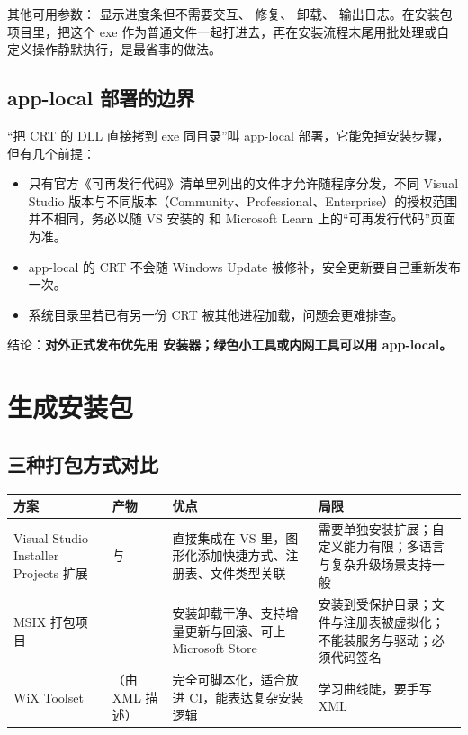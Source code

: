 其他可用参数： 显示进度条但不需要交互、 修复、 卸载、 输出日志。在安装包项目里，把这个 exe 作为普通文件一起打进去，再在安装流程末尾用批处理或自定义操作静默执行，是最省事的做法。
\subsection{app-local 部署的边界}
“把 CRT 的 DLL 直接拷到 exe 同目录”叫 app-local 部署，它能免掉安装步骤，但有几个前提：
\begin{itemize}
  \item 只有官方《可再发行代码》清单里列出的文件才允许随程序分发，不同 Visual Studio 版本与不同版本（Community、Professional、Enterprise）的授权范围并不相同，务必以随 VS 安装的  和 Microsoft Learn 上的“可再发行代码”页面为准。
  \item app-local 的 CRT 不会随 Windows Update 被修补，安全更新要自己重新发布一次。
  \item 系统目录里若已有另一份 CRT 被其他进程加载，问题会更难排查。
\end{itemize}

结论：\textbf{对外正式发布优先用  安装器；绿色小工具或内网工具可以用 app-local。}
\section{生成安装包}
\subsection{三种打包方式对比}
\begin{longtable}{L{3.4cm}L{2.6cm}L{4.1cm}L{4.1cm}}
\toprule
\textbf{方案} & \textbf{产物} & \textbf{优点} & \textbf{局限} \\
\midrule
Visual Studio Installer Projects 扩展 &  与  & 直接集成在 VS 里，图形化添加快捷方式、注册表、文件类型关联 & 需要单独安装扩展；自定义能力有限；多语言与复杂升级场景支持一般 \\
MSIX 打包项目 &  & 安装卸载干净、支持增量更新与回滚、可上 Microsoft Store & 安装到受保护目录；文件与注册表被虚拟化；不能装服务与驱动；必须代码签名 \\
WiX Toolset & （由 XML 描述） & 完全可脚本化，适合放进 CI，能表达复杂安装逻辑 & 学习曲线陡，要手写 XML \\
\bottomrule
\end{longtable}
